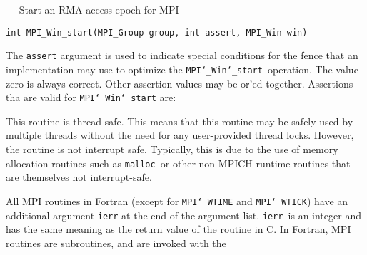 \startmanpage
{}
--- Start an RMA access epoch for MPI 
\startvb\begin{verbatim}
int MPI_Win_start(MPI_Group group, int assert, MPI_Win win)

\end{verbatim}
\endvb

\par
{}
The {\tt assert} argument is used to indicate special conditions for the
fence that an implementation may use to optimize the {\tt MPI{\tt \char`\_}Win{\tt \char`\_}start
}operation.  The value zero is always correct.  Other assertion values
may be or'ed together.  Assertions tha are valid for {\tt MPI{\tt \char`\_}Win{\tt \char`\_}start} are:
\par
{}
\par
{}
\par
This routine is thread-safe.  This means that this routine may be
safely used by multiple threads without the need for any user-provided
thread locks.  However, the routine is not interrupt safe.  Typically,
this is due to the use of memory allocation routines such as {\tt malloc
}or other non-MPICH runtime routines that are themselves not interrupt-safe.
\par
{}
All MPI routines in Fortran (except for {\tt MPI{\tt \char`\_}WTIME} and {\tt MPI{\tt \char`\_}WTICK}) have
an additional argument {\tt ierr} at the end of the argument list.  {\tt ierr
}is an integer and has the same meaning as the return value of the routine
in C.  In Fortran, MPI routines are subroutines, and are invoked with the
